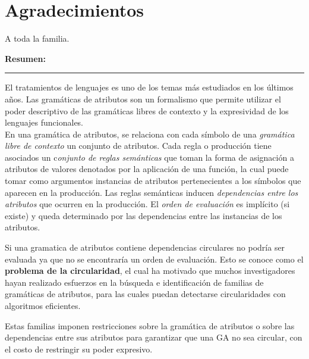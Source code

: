 \documentclass[a4paper,12pt,twoside]{ThesisStyle}
\begin{document}


\dominitoc


\cleardoublepage

\section*{Agradecimientos}

A toda la familia.

\cleardoublepage

\begin{vcenterpage}



{\large\textbf{Resumen:\\}}
\noindent\rule[2pt]{\textwidth}{0.5pt}

El tratamientos de lenguajes es uno de los temas más estudiados en los últimos años.
Las gramáticas de atributos son un formalismo que permite utilizar el poder descriptivo de las gramáticas libres de contexto y la expresividad de los lenguajes funcionales.\\ 

En una gramática de atributos, se relaciona con cada símbolo de una \textit{gramática libre de contexto} un conjunto de atributos. Cada regla o producción tiene asociados un c\textit{onjunto de reglas semánticas} que toman la forma de asignación a atributos de valores denotados por la aplicación de una función, la cual puede tomar como argumentos instancias de atributos pertenecientes a los símbolos que aparecen en la producción.
Las reglas semánticas inducen \textit{dependencias entre los atributos} que ocurren en la producción. El \textit{orden de evaluación} es implícito (si existe) y queda determinado por las dependencias entre las instancias de los atributos.

Si una gramatica de atributos contiene dependencias circulares no podría ser evaluada ya que no se encontraría un orden de evaluación. Esto se conoce como el \textbf{problema de la circularidad}, el cual ha motivado que muchos investigadores hayan realizado esfuerzos en la búsqueda e identificación de familias de gramáticas de atributos, para las cuales puedan detectarse circularidades con algoritmos eficientes.

Estas familias imponen restricciones sobre la gramática de atributos o sobre las dependencias entre sus atributos para garantizar que una GA no sea circular, con el costo de restringir su poder expresivo.


\end{vcenterpage}
\end{document}
